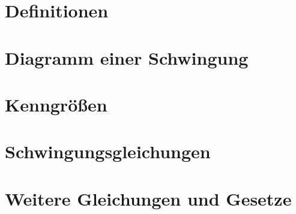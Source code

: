 \section{Definitionen} \label{sec:definition_schwingung}


\section{Diagramm einer Schwingung} \label{sec:diagramm_schwingung}


\section{Kenngrößen} \label{sec:kenngroessen_schwingungen}


\section{Schwingungsgleichungen} \label{sec:schwingungsgleichungen}


\section{Weitere Gleichungen und Gesetze} \label{sec:gesetze_schwingungen}
